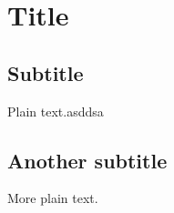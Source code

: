 \documentclass{article}
\begin{document}
\section{Title}

\subsection{Subtitle}

Plain text.asddsa

\subsection{Another subtitle}

More plain text.
\end{document}
